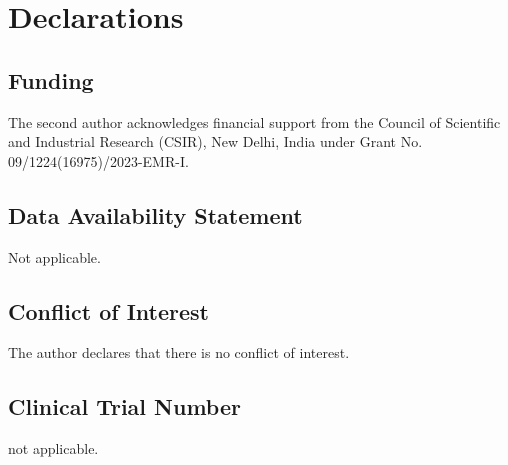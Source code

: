 \documentclass[11pt, reqno]{amsart}
\newtheorem*{cor A}{Corollary A}
\newtheorem*{cor B}{Corollary B}
\numberwithin{equation}{section}
\begin{document}
\section*{Declarations}

\subsection*{Funding}
The second author acknowledges financial support from the Council of Scientific and Industrial Research (CSIR), New Delhi, India under Grant No. 09/1224(16975)/2023-EMR-I.

\subsection*{Data Availability Statement}
Not applicable.

\subsection*{Conflict of Interest}
The author declares that there is no conflict of interest.

\subsection*{Clinical Trial Number} not applicable.
\end{document}
